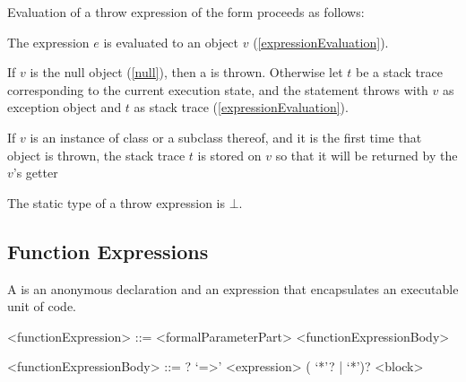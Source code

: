 \documentclass[makeidx]{article}
\begin{document}
{\LMHash{}%
Evaluation of a throw expression of the form  proceeds as follows:

\LMHash{}%
The expression $e$ is evaluated to an object $v$
(\ref{expressionEvaluation}).


\LMHash{}%
If $v$ is the null object (\ref{null}), then a  is thrown.
Otherwise let $t$ be a stack trace corresponding to the current execution state,
and the \THROW{} statement throws with $v$ as exception object
and $t$ as stack trace (\ref{expressionEvaluation}).

\LMHash{}%
If $v$ is an instance of class  or a subclass thereof,
and it is the first time that  object is thrown,
the stack trace $t$ is stored on $v$ so that it will be returned
by the $v$'s  getter


\LMHash{}%
The static type of a throw expression is $\bot$.


\subsection{Function Expressions}

\LMHash{}%
A 
is an anonymous declaration and an expression
that encapsulates an executable unit of code.

\begin{grammar}
<functionExpression> ::= <formalParameterPart> <functionExpressionBody>

<functionExpressionBody> ::= \ASYNC? `=>' <expression>
  \alt (\ASYNC{} `*'? | \SYNC{} `*')? <block>
\end{grammar}

}
\end{document}
